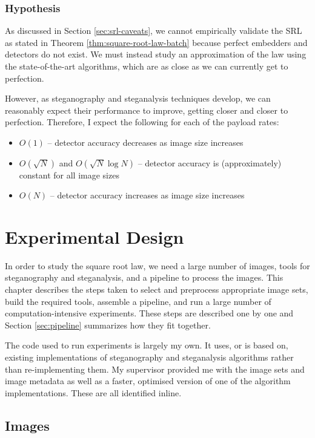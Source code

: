 \documentclass[11pt,a4paper,twoside,openright]{report}
\begin{document}
\subsection{Hypothesis} \label{sec:hypothesis}

As discussed in Section \ref{sec:srl-caveats}, we cannot empirically validate the SRL as stated in Theorem \ref{thm:square-root-law-batch} because perfect embedders and detectors do not exist. We must instead study an approximation of the law using the state-of-the-art algorithms, which are as close as we can currently get to perfection.

However, as steganography and steganalysis techniques develop, we can reasonably expect their performance to improve, getting closer and closer to perfection. Therefore, I expect the following for each of the payload rates:
\begin{itemize}
	\item $O(1)$ -- detector accuracy decreases as image size increases
	\item $O(\sqrt{N})$ and $O(\sqrt{N} \log{N})$ -- detector accuracy is (approximately) constant for all image sizes
	\item $O(N)$ -- detector accuracy increases as image size increases
\end{itemize}


\chapter{Experimental Design}

In order to study the square root law, we need a large number of images, tools for steganography  and steganalysis, and a pipeline to process the images. This chapter describes the steps taken to select and preprocess appropriate image sets, build the required tools, assemble a pipeline, and run a large number of computation-intensive experiments. These steps are described one by one and Section \ref{sec:pipeline} summarizes how they fit together.

The code used to run experiments is largely my own. It uses, or is based on, existing implementations of steganography and steganalysis algorithms rather than re-implementing them. My supervisor provided me with the image sets and image metadata as well as a faster, optimised version of one of the algorithm implementations. These are all identified inline.


\section{Images}
\end{document}
